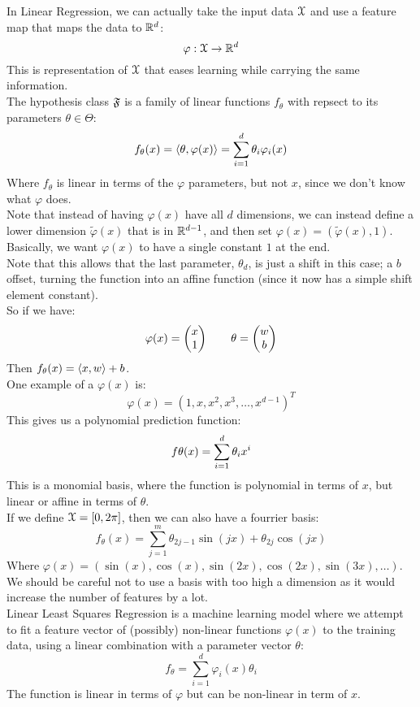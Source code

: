 \documentclass[12pt]{article}
\begin{document}
In Linear Regression, we can actually take the 
input data $\mathcal{X}$ and use a feature
map that maps the data to $\mathbb{R}^d$:
\[ \varphi: \mathcal{X} \to \mathbb{R}^d \]
This is representation of $\mathcal{X}$ 
that eases learning while carrying the same
information. \\

The hypothesis class $\mathfrak{F}$ is a family of
linear functions $f_\theta$ with
repsect to its parameters $\theta \in \Theta$:
\[ f_\theta(x) = \left\langle \theta, \varphi(x) \right\rangle
= \sum_{i = 1}^d \theta_i \varphi_i(x) \]
Where $f_\theta$ is linear in terms of the
$\varphi$ parameters, but not $x$,
since we don't know what $\varphi$ does. \\

Note that instead of having $\varphi(x)$
have all $d$ dimensions, we can instead define
a lower dimension $\tilde{\varphi}(x)$
that is in $\mathbb{R}^{d-1}$,
and then set $\varphi(x) = (\tilde{\varphi}(x), 1)$. \\
Basically, we want $\varphi(x)$ to have
a single constant $1$ at the end. \\
Note that this allows that the last parameter,
$\theta_d$, is just a shift in this case;
a $b$ offset,
turning the function into an affine function
(since it now has a simple shift element constant). \\
So if we have:
\[ \varphi(x) = \begin{pmatrix} x \\ 1 \end{pmatrix} \qquad
\theta = \begin{pmatrix} w \\ b \end{pmatrix} \] 
Then $f_\theta(x) = \left\langle x, w \right\rangle + b$. \\

One example of a $\varphi(x)$ is:
\[ \varphi(x) = (1, x, x^2, x^3, \dots, x^{d-1})^T \]
This gives us a polynomial prediction function:
\[ f\theta(x) = \sum_{i=1}^{d}\theta_i x^i \]
This is a monomial basis, where the function
is polynomial in terms of $x$,
but linear or affine in terms of $\theta$. \\

If we define $\mathcal{X} = [0, 2\pi]$,
then we can also have a fourrier basis:
\[ f_\theta(x)
= \sum_{j = 1}^{m} \theta_{2j-1}\sin(jx) 
+ \theta_{2j}\cos(jx) \]
Where $\varphi(x) = (\sin(x), \cos(x),
\sin(2x), \cos(2x), \sin(3x), \dots)$. \\

We should be careful not to use a basis with too
high a dimension as it would increase the number
of features by a lot. \\

Linear Least Squares Regression 
is a machine learning model where
we attempt to fit a feature vector of (possibly)
non-linear functions $\varphi(x)$ to the training
data, using a linear combination with a parameter
vector $\theta$:
\[ f_\theta
= \sum_{i=1}^{d} \varphi_i(x) \theta_i \]
The function is linear in terms of $\varphi$
but can be non-linear in term of $x$. \\
\end{document}
